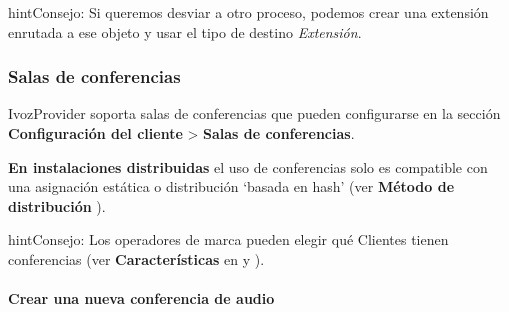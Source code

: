 \documentclass[letterpaper,10pt,spanish]{sphinxmanual}
\begin{document}
\begin{notice}{hint}{Consejo:}
Si queremos desviar a otro proceso, podemos crear una extensión enrutada a ese objeto y usar el tipo de destino \emph{Extensión}.
\end{notice}


\subsubsection{Salas de conferencias}
\label{administration_portal/client/vpbx/routing_endpoints/conference_rooms::doc}\label{administration_portal/client/vpbx/routing_endpoints/conference_rooms:conference-rooms}\label{administration_portal/client/vpbx/routing_endpoints/conference_rooms:id1}
IvozProvider soporta salas de conferencias que pueden configurarse en la sección \textbf{Configuración del cliente} \textgreater{} \textbf{Salas de conferencias}.

\textbf{En instalaciones distribuidas} el uso de conferencias solo es compatible con una asignación estática o distribución `basada en hash' (ver \textbf{Método de distribución} {\hyperref[administration_portal/brand/clients/virtual_pbx:virtual\string-pbx]{}}).

\begin{notice}{hint}{Consejo:}
Los operadores de marca pueden elegir qué Clientes tienen conferencias (ver \textbf{Características} en {\hyperref[getting_started/internal_calls/brand_portal:brand\string-configuration]{}} y {\hyperref[getting_started/internal_calls/client_portal:client\string-configuration]{}}).
\end{notice}
\paragraph{Crear una nueva conferencia de audio}
\end{document}
